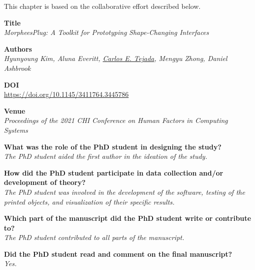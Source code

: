   \newpage

  This chapter is based on the collaborative effort described below.

  \vfill

  \noindent
  \textbf{Title}\\
  \textit{MorpheesPlug: A Toolkit for Prototyping Shape-Changing Interfaces}

  \bigskip

  \noindent
  \textbf{Authors}\\
  \textit{Hyunyoung Kim, Aluna Everitt, \underline{Carlos E. Tejada}, Mengyu Zhong, Daniel Ashbrook}

  \bigskip

  \noindent
  \textbf{DOI}\\
  \href{https://doi.org/10.1145/3411764.3445786}{https://doi.org/10.1145/3411764.3445786}

  \bigskip

  \noindent
  \textbf{Venue}\\
  \textit{Proceedings of the 2021 CHI Conference on Human Factors in Computing Systems}


  \bigskip

  \noindent
	\textbf{What was the role of the PhD student in designing the study?}\\
  \textit{The PhD student aided the first author in the ideation of the study.}

	\bigskip

	\noindent
	\textbf{How did the PhD student participate in data collection and/or development of theory?}\\
  \textit{The PhD student was involved in the development of the software,
    testing of the printed objects, and visualization of their specific results.}

	\bigskip

	\noindent
	\textbf{Which part of the manuscript did the PhD student write or contribute to?}\\
  \textit{The PhD student contributed to all parts of the manuscript.}

	\bigskip

	\noindent
	\textbf{Did the PhD student read and comment on the final manuscript?}\\
	\textit{Yes.}

  \bigskip
  \vfill

  \newpage

